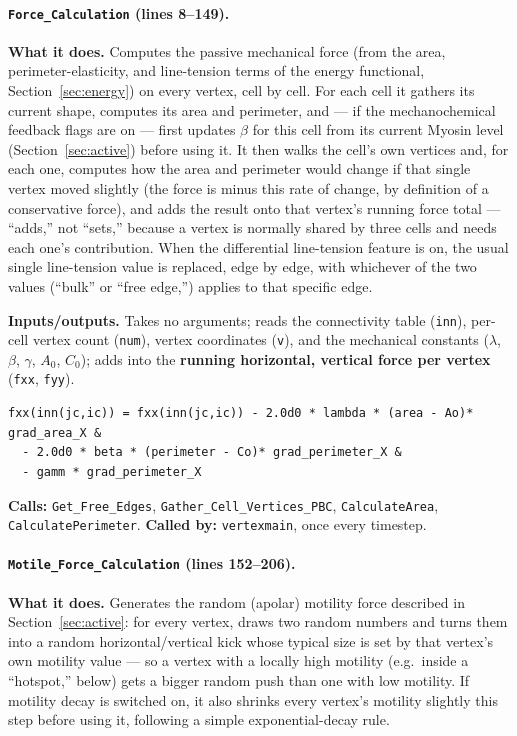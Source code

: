 \documentclass[11pt]{article}
\begin{document}
\paragraph{\texttt{Force\_Calculation} (lines 8--149).}
\textbf{What it does.} Computes the passive mechanical force (from the area,
perimeter-elasticity, and line-tension terms of the energy functional,
Section~\ref{sec:energy}) on every vertex, cell by cell. For each cell it gathers its
current shape, computes its area and perimeter, and --- if the mechanochemical feedback
flags are on --- first updates $\beta$ for this cell from its current Myosin level
(Section~\ref{sec:active}) before using it. It then walks the cell's own vertices and,
for each one, computes how the area and perimeter would change if that single vertex
moved slightly (the force is minus this rate of change, by definition of a
conservative force), and adds the result onto that vertex's running force total ---
``adds,'' not ``sets,'' because a vertex is normally shared by three cells and needs
each one's contribution. When the differential line-tension feature is on, the usual
single line-tension value is replaced, edge by edge, with whichever of the two values
(``bulk'' or ``free edge,'') applies to that specific edge.

\textbf{Inputs/outputs.} Takes no arguments; reads the connectivity table
(\texttt{inn}), per-cell vertex count (\texttt{num}), vertex coordinates (\texttt{v}),
and the mechanical constants ($\lambda$, $\beta$, $\gamma$, $A_0$, $C_0$); adds into the
\textbf{running horizontal, vertical force per vertex} (\texttt{fxx}, \texttt{fyy}).

\begin{lstlisting}[caption={The per-vertex force update in \texttt{Force\_Calculation} --- one vertex's contribution from one cell.}]
fxx(inn(jc,ic)) = fxx(inn(jc,ic)) - 2.0d0 * lambda * (area - Ao)* grad_area_X &
  - 2.0d0 * beta * (perimeter - Co)* grad_perimeter_X &
  - gamm * grad_perimeter_X
\end{lstlisting}

\textbf{Calls:} \texttt{Get\_Free\_Edges}, \texttt{Gather\_Cell\_Vertices\_PBC},
\texttt{CalculateArea}, \texttt{CalculatePerimeter}. \textbf{Called by:}
\texttt{vertexmain}, once every timestep.

\paragraph{\texttt{Motile\_Force\_Calculation} (lines 152--206).}
\textbf{What it does.} Generates the random (apolar) motility force described in
Section~\ref{sec:active}: for every vertex, draws two random numbers and turns them
into a random horizontal/vertical kick whose typical size is set by that vertex's own
motility value --- so a vertex with a locally high motility (e.g.\ inside a
``hotspot,'' below) gets a bigger random push than one with low motility. If motility
decay is switched on, it also shrinks every vertex's motility slightly this step before
using it, following a simple exponential-decay rule.
\end{document}
